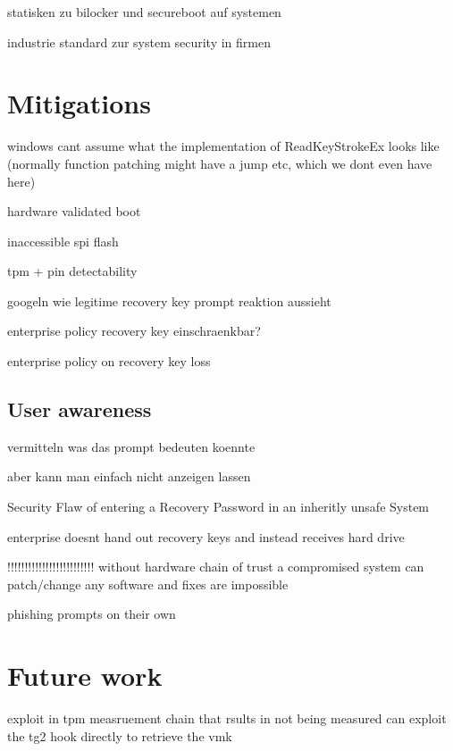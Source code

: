 statisken zu bilocker und secureboot auf systemen

industrie standard zur system security in firmen

\section{Mitigations}

windows cant assume what the implementation of ReadKeyStrokeEx looks like (normally function patching might have a jump etc, which we dont even have here)

hardware validated boot

inaccessible spi flash

tpm + pin detectability

googeln wie legitime recovery key prompt reaktion aussieht

enterprise policy recovery key einschraenkbar?

enterprise policy on recovery key loss


\subsection{User awareness}

vermitteln was das prompt bedeuten koennte

aber kann man einfach nicht anzeigen lassen

Security Flaw of entering a Recovery Password in an inheritly unsafe System

enterprise doesnt hand out recovery keys and instead receives hard drive


!!!!!!!!!!!!!!!!!!!!!!!!!
without hardware chain of trust a compromised system can patch/change any software and fixes are impossible

phishing prompts on their own

\section{Future work}
exploit in tpm measruement chain that rsults in not being measured
can exploit the tg2 hook directly to retrieve the vmk